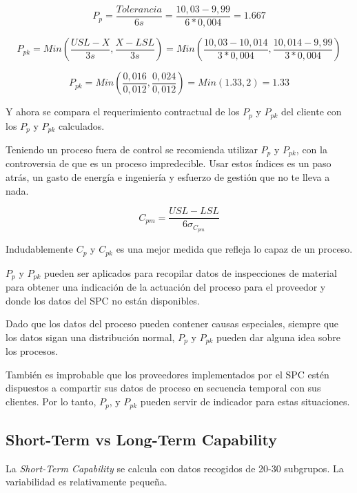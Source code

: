 \documentclass[oneside]{book}
\begin{document}
\begin{equation}
P_p = \frac{Tolerancia}{6s} = \frac{10,03 - 9,99}{6*0,004} = 1.667
\end{equation}

\begin{equation}
P_{pk}= Min(\frac{USL - X}{3s}, \frac{X - LSL}{3s}) = Min(\frac{10,03-10,014}{3*0,004},\frac{10,014-9,99}{3*0,004})
\end{equation}

\begin{equation}
P_{pk} = Min(\frac{0,016}{0,012},\frac{0,024}{0,012})= Min(1.33 , 2) = 1.33
\end{equation}

Y ahora se compara el requerimiento contractual de los $P_p$ y $P_{pk}$ del cliente con los $P_p$ y $P_{pk}$ calculados.

Teniendo un proceso fuera de control se recomienda utilizar $P_p$ y $P_{pk}$, con la controversia de que es un proceso impredecible. Usar estos índices es un paso atrás, un gasto de energía e ingeniería y esfuerzo de gestión que no te lleva a nada.

\begin{equation}
C_{pm} = \frac{USL - LSL}{6 \sigma_{C_{pm}}}
\end{equation}

Indudablemente $C_p$ y $C_{pk}$ es una mejor medida que refleja lo capaz de un proceso.

$P_p$ y $P_{pk}$ pueden ser aplicados para recopilar datos de inspecciones de material para obtener una indicación de la actuación del proceso para el proveedor y donde los datos del SPC no están disponibles.

Dado que los datos del proceso pueden contener causas especiales, siempre que los datos sigan una distribución normal, $P_p$ y $P_{pk}$ pueden dar alguna idea sobre los procesos.

También es improbable que los proveedores implementados por el SPC estén dispuestos a compartir sus datos de proceso en secuencia temporal con sus clientes. Por lo tanto, $P_p$,
y $P_{pk}$ pueden servir de indicador para estas situaciones.

\subsection{Short-Term vs Long-Term Capability}

La \textit{Short-Term Capability} se calcula con datos recogidos de 20-30 subgrupos. La variabilidad es relativamente pequeña.
\end{document}
